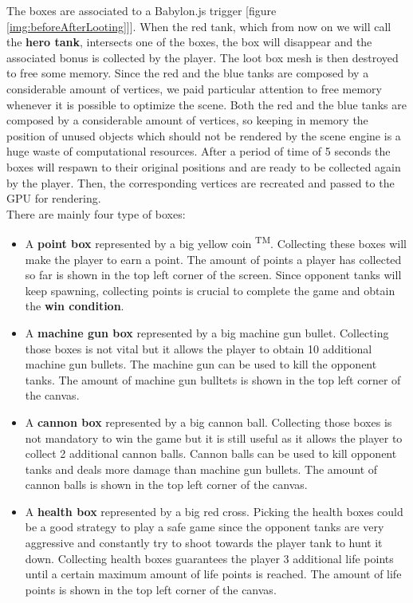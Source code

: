 \documentclass[14pt]{article}
\begin{document}
The boxes are associated to a Babylon.js trigger [figure \ref{img:beforeAfterLooting}]]. When the red tank, which from now on we will call the \textbf{hero tank}, intersects one of the boxes, the box will disappear and the associated bonus is collected by the player. The loot box mesh is then destroyed to free some memory. Since the red and the blue tanks are composed by a considerable amount of vertices, we paid particular attention to free memory whenever it is possible to optimize the scene. Both the red and the blue tanks are composed by a considerable amount of vertices, so keeping in memory the position of unused objects which should not be rendered by the scene engine is a huge waste of computational resources. After a period of time of 5 seconds the boxes will respawn to their original positions and are ready to be collected again by the player. Then, the corresponding vertices are recreated and passed to the GPU for rendering. \\
There are mainly four type of boxes:
\begin{itemize}

\item A \textbf{point box} represented by a big yellow coin \textsuperscript{TM}. Collecting these boxes will make the player to earn a point. The amount of points a player has collected so far is shown in the top left corner of the screen. Since opponent tanks will keep spawning, collecting points is crucial to complete the game and obtain the \textbf{win condition}. 

\item A \textbf{machine gun box} represented by a big machine gun bullet. Collecting those boxes is not vital but it allows the player to obtain 10 additional machine gun bullets. The machine gun can be used to kill the opponent tanks. The amount of machine gun bulltets is shown in the top left corner of the canvas. 

\item A \textbf{cannon box} represented by a big cannon ball. Collecting those boxes is not mandatory to win the game but it is still useful as it allows the player to collect 2 additional cannon balls. Cannon balls can be used to kill opponent tanks and deals more damage than machine gun bullets. The amount of cannon balls is shown in the top left corner of the canvas.

\item A \textbf{health box} represented by a big red cross. Picking the health boxes could be a good strategy to play a safe game since the opponent tanks are very aggressive and constantly try to shoot towards the player tank to hunt it down. Collecting health boxes guarantees the player 3 additional life points until a certain maximum amount of life points is reached. The amount of life points is shown in the top left corner of the canvas.

\end{itemize}
\end{document}
